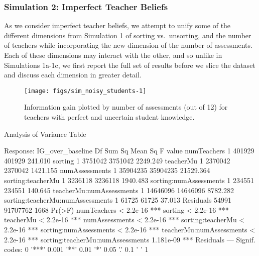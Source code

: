 \documentclass[10pt, letterpaper]{article}
\newenvironment{CodeChunk}{}{}
\begin{document}
\subsubsection{Simulation 2: Imperfect Teacher
Beliefs}\label{simulation-2-imperfect-teacher-beliefs}

As we consider imperfect teacher beliefs, we attempt to unify some of
the different dimensions from Simulation 1 of sorting vs.~unsorting, and
the number of teachers while incorporating the new dimension of the
number of assessments. Each of these dimensions may interact with the
other, and so unlike in Simulations 1a-1c, we first report the full set
of results before we slice the dataset and discuss each dimension in
greater detail.

\begin{CodeChunk}
\begin{figure*}[t]
\texttt{[image: figs/sim\_noisy\_students-1]} \caption[Information gain plotted by number of assessments (out of 12) for teachers with perfect and uncertain student knowledge]{Information gain plotted by number of assessments (out of 12) for teachers with perfect and uncertain student knowledge.}\label{fig:sim_noisy_students}
\end{figure*}
\end{CodeChunk}

\begin{CodeChunk}
\begin{CodeOutput}
Analysis of Variance Table

Response: IG_over_baseline
                                    Df   Sum Sq  Mean Sq   F value
numTeachers                          1   401929   401929   241.010
sorting                              1  3751042  3751042  2249.249
teacherMu                            1  2370042  2370042  1421.155
numAssessments                       1 35904235 35904235 21529.364
sorting:teacherMu                    1  3236118  3236118  1940.483
sorting:numAssessments               1   234551   234551   140.645
teacherMu:numAssessments             1 14646096 14646096  8782.282
sorting:teacherMu:numAssessments     1    61725    61725    37.013
Residuals                        54991 91707762     1668          
                                    Pr(>F)    
numTeachers                      < 2.2e-16 ***
sorting                          < 2.2e-16 ***
teacherMu                        < 2.2e-16 ***
numAssessments                   < 2.2e-16 ***
sorting:teacherMu                < 2.2e-16 ***
sorting:numAssessments           < 2.2e-16 ***
teacherMu:numAssessments         < 2.2e-16 ***
sorting:teacherMu:numAssessments 1.181e-09 ***
Residuals                                     
---
Signif. codes:  0 '***' 0.001 '**' 0.01 '*' 0.05 '.' 0.1 ' ' 1
\end{CodeOutput}
\end{CodeChunk}
\end{document}
